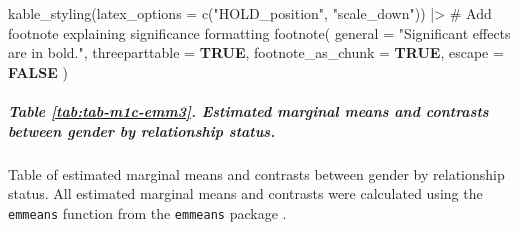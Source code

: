 \documentclass[
  bookmarksnumbered]{article}
\newenvironment{Shaded}{\begin{snugshade}}{\end{snugshade}}
\newcommand{\AttributeTok}[1]{\textcolor[rgb]{0.80,0.80,0.80}{#1}}
\newcommand{\CommentTok}[1]{\textcolor[rgb]{0.50,0.62,0.50}{#1}}
\newcommand{\ConstantTok}[1]{\textcolor[rgb]{0.86,0.64,0.64}{\textbf{#1}}}
\newcommand{\FunctionTok}[1]{\textcolor[rgb]{0.94,0.94,0.56}{#1}}
\newcommand{\NormalTok}[1]{\textcolor[rgb]{0.80,0.80,0.80}{#1}}
\newcommand{\SpecialCharTok}[1]{\textcolor[rgb]{0.86,0.64,0.64}{#1}}
\newcommand{\StringTok}[1]{\textcolor[rgb]{0.80,0.58,0.58}{#1}}
\begin{document}
\begin{Shaded}
\begin{Highlighting}[]
  \FunctionTok{kable\_styling}\NormalTok{(}\AttributeTok{latex\_options =} \FunctionTok{c}\NormalTok{(}\StringTok{"HOLD\_position"}\NormalTok{, }\StringTok{"scale\_down"}\NormalTok{)) }\SpecialCharTok{|\textgreater{}}
  \CommentTok{\# Add footnote explaining significance formatting}
  \FunctionTok{footnote}\NormalTok{(}
    \AttributeTok{general =} \StringTok{"Significant effects are in bold."}\NormalTok{, }\AttributeTok{threeparttable =} \ConstantTok{TRUE}\NormalTok{,}
    \AttributeTok{footnote\_as\_chunk =} \ConstantTok{TRUE}\NormalTok{, }\AttributeTok{escape =} \ConstantTok{FALSE}
\NormalTok{  )}
\end{Highlighting}
\end{Shaded}

\begin{table}[H]
\centering
\caption{\label{tab:tab-m1c-emm2}Estimated marginal means and contrasts between relationship status}
\centering
{}
\end{table}

\subparagraph{Table \ref{tab:tab-m1c-emm3}. Estimated marginal means and contrasts between gender by relationship status.}\label{table-reftabtab-m1c-emm3.-estimated-marginal-means-and-contrasts-between-gender-by-relationship-status.}

Table of estimated marginal means and contrasts between gender by relationship status. All estimated marginal means and contrasts were calculated using the \texttt{emmeans} function from the \texttt{emmeans} package \autocite{emmeanscit}.
\end{document}
